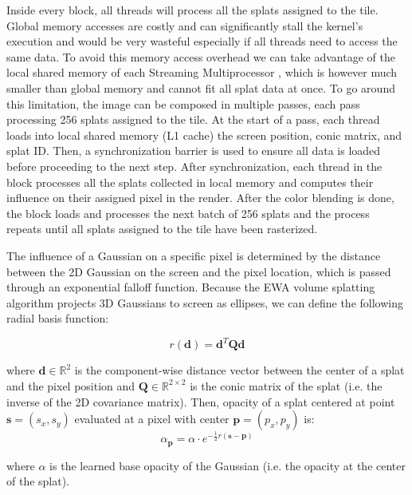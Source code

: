 Inside every block, all threads will process all the splats assigned to the tile. Global memory accesses are costly and can significantly stall the kernel's execution and would be very wasteful especially if all threads need to access the same data. To avoid this memory access overhead we can take advantage of the local shared memory of each Streaming Multiprocessor \cite{cuda_ref}, which is however much smaller than global memory and cannot fit all splat data at once. To go around this limitation, the image can be composed in multiple passes, each pass processing 256 splats assigned to the tile. At the start of a pass, each thread loads into local shared memory (L1 cache) the screen position, conic matrix, and splat ID. Then, a synchronization barrier is used to ensure all data is loaded before proceeding to the next step. After synchronization, each thread in the block processes all the splats collected in local memory and computes their influence on their assigned pixel in the render. After the color blending is done, the block loads and processes the next batch of 256 splats and the process repeats until all splats assigned to the tile have been rasterized.

The influence of a Gaussian on a specific pixel is determined by the distance between the 2D Gaussian on the screen and the pixel location, which is passed through an exponential falloff function. Because the EWA volume splatting algorithm projects 3D Gaussians to screen as ellipses, we can define the following radial basis function:

\[
r(\bm{d}) = \bm{d}^T \bm{Q} \bm{d}
\]

where $\bm{d} \in \mathbb{R}^{2}$ is the component-wise distance vector between the center of a splat and the pixel position and $\bm{Q} \in \mathbb{R}^{2 \times 2}$ is the conic matrix of the splat (i.e. the inverse of the 2D covariance matrix). Then, opacity of a splat centered at point $\bm{s} = (s_x, s_y)$ evaluated at a pixel with center $\bm{p} = (p_x, p_y)$ is:
\[
\alpha_{\bm{p}} = \alpha \cdot e^{-\frac{1}{2}r(\bm{s} - \bm{p})} 
\]

where $\alpha$ is the learned base opacity of the Gaussian (i.e. the opacity at the center of the splat). 
%     

